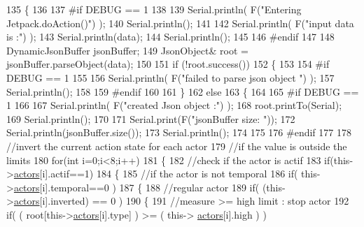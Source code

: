 \begin{DoxyCode}
135 \{
136 
137 \textcolor{preprocessor}{#if DEBUG == 1 }
138 
139     Serial.println( F(\textcolor{stringliteral}{"Entering Jetpack.doAction()"}) );
140     Serial.println();
141 
142     Serial.println( F(\textcolor{stringliteral}{"input data is :"}) );
143     Serial.println(data);
144     Serial.println();
145 
146 \textcolor{preprocessor}{#endif }
147 
148     DynamicJsonBuffer jsonBuffer;
149     JsonObject& root = jsonBuffer.parseObject(data);
150     
151     \textcolor{keywordflow}{if} (!root.success()) 
152     \{
153     
154 \textcolor{preprocessor}{    #if DEBUG == 1 }
155 
156         Serial.println( F(\textcolor{stringliteral}{"failed to parse json object "}) );
157         Serial.println();
158     
159 \textcolor{preprocessor}{    #endif }
160 
161     \}
162     \textcolor{keywordflow}{else}
163     \{
164     
165 \textcolor{preprocessor}{    #if DEBUG == 1 }
166 
167         Serial.println( F(\textcolor{stringliteral}{"created Json object :"}) );
168         root.printTo(Serial);
169         Serial.println();
170 
171         Serial.print(F(\textcolor{stringliteral}{"jsonBuffer size: "}));
172         Serial.println(jsonBuffer.size());
173         Serial.println();
174 
175     
176 \textcolor{preprocessor}{    #endif }
177 
178         \textcolor{comment}{//invert the current action state for each actor}
179         \textcolor{comment}{//if the value is outside the limits}
180         \textcolor{keywordflow}{for}(\textcolor{keywordtype}{int} i=0;i<8;i++)
181         \{
182             \textcolor{comment}{//check if the actor is actif }
183             \textcolor{keywordflow}{if}(this->\hyperlink{classJetpack_a7e16d2f97837f9712a2e6de1c50d99db}{actors}[i].actif==1)
184             \{   
185                 \textcolor{comment}{//if the actor is not temporal}
186                 \textcolor{keywordflow}{if}( this->\hyperlink{classJetpack_a7e16d2f97837f9712a2e6de1c50d99db}{actors}[i].temporal==0 ) 
187                 \{   
188                     \textcolor{comment}{//regular actor}
189                     \textcolor{keywordflow}{if}( (this->\hyperlink{classJetpack_a7e16d2f97837f9712a2e6de1c50d99db}{actors}[i].inverted) == 0 )
190                     \{
191                         \textcolor{comment}{//measure >= high limit : stop actor}
192                         \textcolor{keywordflow}{if}( ( root[this->\hyperlink{classJetpack_a7e16d2f97837f9712a2e6de1c50d99db}{actors}[i].type] ) >= ( this->
      \hyperlink{classJetpack_a7e16d2f97837f9712a2e6de1c50d99db}{actors}[i].high ) )    

\end{DoxyCode}
